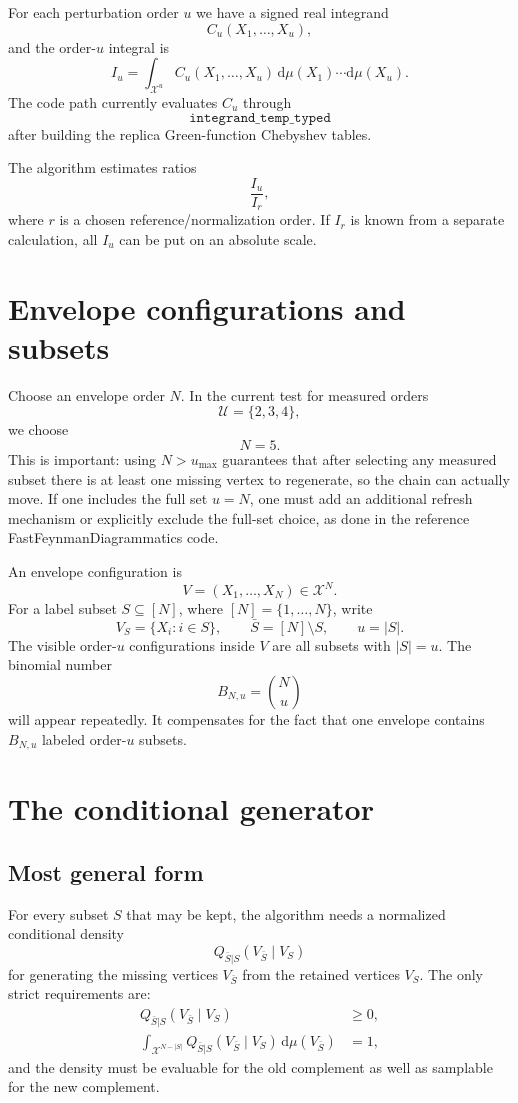 \documentclass[11pt]{article}
\newcommand{\dd}{\mathrm{d}}
\newcommand{\1}{\mathbf{1}}
\newcommand{\calU}{\mathcal{U}}
\newcommand{\calX}{\mathcal{X}}
\newcommand{\card}[1]{\left|#1\right|}
\begin{document}
For each perturbation order \(u\) we have a signed real integrand
\[
  C_u(X_1,\ldots,X_u),
\]
and the order-\(u\) integral is
\[
  I_u
  =
  \int_{\calX^u}
  C_u(X_1,\ldots,X_u)\,
  \dd\mu(X_1)\cdots \dd\mu(X_u).
\]
The code path currently evaluates \(C_u\) through
\[
  \texttt{integrand\_temp\_typed}
\]
after building the replica Green-function Chebyshev tables.

The algorithm estimates ratios
\[
  \frac{I_u}{I_r},
\]
where \(r\) is a chosen reference/normalization order.  If \(I_r\) is known
from a separate calculation, all \(I_u\) can be put on an absolute scale.

\section{Envelope configurations and subsets}

Choose an envelope order \(N\).  In the current test for measured orders
\[
  \calU=\{2,3,4\},
\]
we choose
\[
  N=5.
\]
This is important: using \(N>u_{\max}\) guarantees that after selecting any
measured subset there is at least one missing vertex to regenerate, so the
chain can actually move.  If one includes the full set \(u=N\), one must add
an additional refresh mechanism or explicitly exclude the full-set choice, as
done in the reference FastFeynmanDiagrammatics code.

An envelope configuration is
\[
  V=(X_1,\ldots,X_N)\in\calX^N.
\]
For a label subset \(S\subseteq [N]\), where \([N]=\{1,\ldots,N\}\), write
\[
  V_S=\{X_i:i\in S\},\qquad
  \bar S=[N]\setminus S,\qquad
  u=\card{S}.
\]
The visible order-\(u\) configurations inside \(V\) are all subsets with
\(\card{S}=u\).  The binomial number
\[
  B_{N,u}=\binom{N}{u}
\]
will appear repeatedly.  It compensates for the fact that one envelope
contains \(B_{N,u}\) labeled order-\(u\) subsets.

\section{The conditional generator}

\subsection{Most general form}

For every subset \(S\) that may be kept, the algorithm needs a normalized
conditional density
\[
  Q_{\bar S|S}(V_{\bar S}\mid V_S)
\]
for generating the missing vertices \(V_{\bar S}\) from the retained vertices
\(V_S\).  The only strict requirements are:
\begin{align}
  Q_{\bar S|S}(V_{\bar S}\mid V_S) &\ge 0,\\
  \int_{\calX^{N-\card{S}}}
  Q_{\bar S|S}(V_{\bar S}\mid V_S)\,
  \dd\mu(V_{\bar S}) &= 1,
\end{align}
and the density must be evaluable for the old complement as well as samplable
for the new complement.
\end{document}
